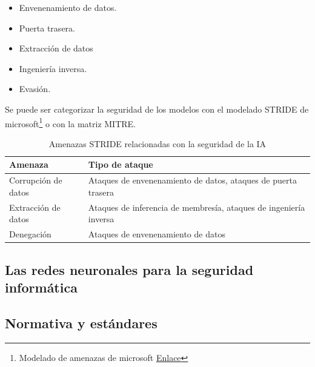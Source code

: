 \begin{itemize}
  \item Envenenamiento de datos.
  \item Puerta trasera.
  \item Extracción de datos
  \item Ingeniería inversa.
  \item Evasión.
\end{itemize}

Se puede ser categorizar la seguridad de los modelos con el modelado \gls{STRIDE} de microsoft\footnote{Modelado de amenazas de microsoft \href{https://learn.microsoft.com/es-es/azure/security/develop/threat-modeling-tool-threats}{Enlace}} o con la matriz \gls{MITRE}.

\begin{table}[H]
  \centering
  \small
  \begin{tabularx}{\textwidth}{|l|X|}
    \hline
    \textbf{Amenaza}    & \textbf{Tipo de ataque}                                           \\
    \hline
    Corrupción de datos & Ataques de envenenamiento de datos, ataques de puerta trasera     \\
    Extracción de datos & Ataques de inferencia de membresía, ataques de ingeniería inversa \\
    Denegación          & Ataques de envenenamiento de datos                                \\
    \hline
  \end{tabularx}
  \caption{Amenazas STRIDE relacionadas con la seguridad de la IA}
  \label{tab:amenazas}
\end{table}


\subsection{Las redes neuronales para la seguridad informática}






\subsection{Normativa y estándares}

